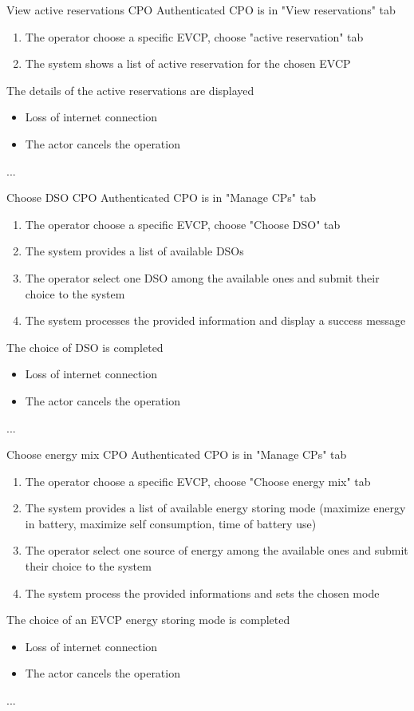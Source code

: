 \usecase
{View active reservations} %
{CPO} %
{Authenticated CPO is in "View reservations" tab} %
{ %
    \begin{enumerate}
        \item The operator choose a specific EVCP, choose "active reservation" tab
        \item The system shows a list of active reservation for the chosen EVCP
    \end{enumerate}
}
{The details of the active reservations are displayed} %
{ %
    \begin{itemize}
        \item Loss of internet connection
        \item The actor cancels the operation
    \end{itemize}
}
{ %
    ...
}

\usecase
{Choose DSO} %
{CPO} %
{Authenticated CPO is in "Manage CPs" tab} %
{ %
    \begin{enumerate}
        \item The operator choose a specific EVCP, choose "Choose DSO" tab
        \item The system provides a list of available DSOs
        \item The operator select one DSO among the available ones and submit their choice to the system
        \item The system processes the provided information and display a success message
    \end{enumerate}
}
{The choice of DSO is completed} %
{ %
    \begin{itemize}
        \item Loss of internet connection
        \item The actor cancels the operation
    \end{itemize}
}
{ %
    ...
}

\usecase
{Choose energy mix} %
{CPO} %
{Authenticated CPO is in "Manage CPs" tab} %
{ %
    \begin{enumerate}
        \item The operator choose a specific EVCP, choose "Choose energy mix" tab
        \item The system provides a list of available energy storing mode (maximize energy in battery, maximize self consumption, time of battery use)
        \item The operator select one source of energy among the available ones and submit their choice to the system
        \item The system process the provided informations and sets the chosen mode
    \end{enumerate}
}
{The choice of an EVCP energy storing mode is completed} %
{ %
    \begin{itemize}
        \item Loss of internet connection
        \item The actor cancels the operation
    \end{itemize}
}
{ %
    ...
}

